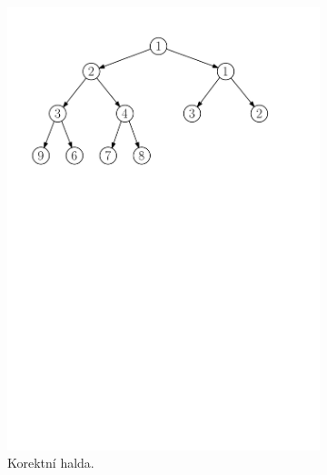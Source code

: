 \begin{figure}[h]
    \centering
    \begin{subfigure}{6cm}
        \centering
        \includegraphics[scale=.4]{01-grafalgo/images/ch01_halda}
        \caption{Korektní halda.}
        \label{subfig:korektni_halda}
    \end{subfigure}
    \quad
    \begin{subfigure}{5cm}
        \centering

\end{subfigure}
\end{figure}
